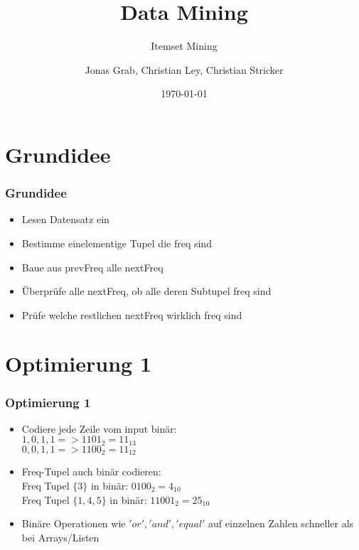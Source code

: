 \documentclass{beamer}
\title{Data Mining}
\subtitle{ Itemset Mining}
\author{Jonas Grab, Christian Ley, Christian Stricker}
\date{\today}
\begin{document}
\frame{\titlepage}
\frame{\tableofcontents[currentsection]}



\section{Grundidee}
\begin{frame} %
  \frametitle{Grundidee} %
  	\begin{itemize}
  		\item Lesen Datensatz ein
  		\item Bestimme einelementige Tupel die freq sind
  		\item Baue aus prevFreq alle nextFreq
  		\item Überprüfe alle nextFreq, ob alle deren Subtupel freq sind
  		\item Prüfe welche restlichen nextFreq  wirklich freq sind
  	\end{itemize}
\end{frame}



\section{Optimierung 1}
\begin{frame} %
	\frametitle{Optimierung 1} %
	\begin{itemize}
		\item Codiere jede Zeile vom input binär:\\
			\hspace{0.7cm}$1,0,1,1 => 1101_2 = 11_{13}$\\
			\hspace{0.7cm}$0,0,1,1 => 1100_2 = 11_{12}$
		\item Freq-Tupel auch binär codieren:\\
			\hspace{0.7cm} Freq Tupel $\{3\}$ in binär: $0100_2 = 4_{10}$\\
			\hspace{0.7cm} Freq Tupel $\{1,4,5\}$ in binär: $11001_2 = 25_{10}$
		\item Binäre Operationen wie $'or', 'and', 'equal'$ auf einzelnen Zahlen schneller als bei Arrays/Listen
	\end{itemize}
\end{frame}
\end{document}
